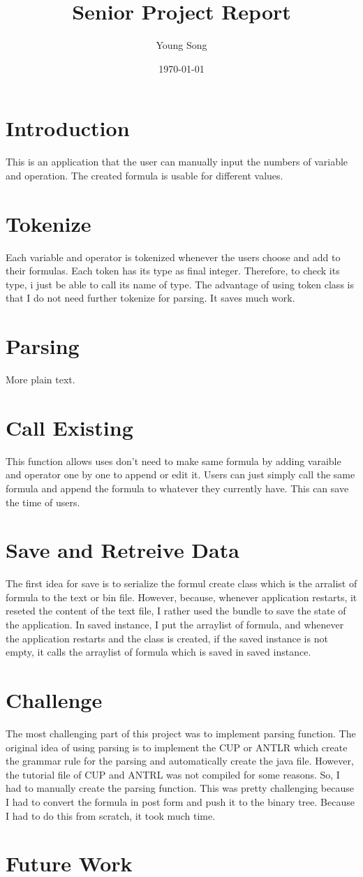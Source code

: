 \documentclass{article}
\title{Senior Project Report}
\author{Young Song}
\date{\today}
\begin{document}
 
 \maketitle

\section{Introduction}
This is an application that the user can manually input the numbers of variable
and operation. The created formula is usable for different values.
\section{Tokenize}
Each variable and operator is tokenized whenever the users choose and add to
their formulas. Each token has its type as final integer. Therefore, to check
its type, i just be able to call its name of type. The advantage of using token
class is that I do not need further tokenize for parsing. It saves much work.
\section{Parsing}

More plain text.
\section{Call Existing}
This function allows uses don't need to make same formula by adding varaible and
operator one by one to append or edit it. Users can just simply call the same
formula and append the formula to whatever they currently have. This can save
the time of users.
\section{Save and Retreive Data}
The first idea for save is to serialize the formul create class which is the
arralist of formula to the text or bin file. However, because, whenever
application restarts, it reseted the content of the text file, I rather used the
bundle to save the state of the application. In saved instance, I put the
arraylist of formula, and whenever the application restarts and the class is
created, if the saved instance is not empty, it calls the arraylist of formula
which is saved in saved instance.
\section{Challenge}
The most challenging part of this project was to implement parsing function. The
original idea of using parsing is to implement the CUP or ANTLR which create the
grammar rule for the parsing and automatically create the java file. However,
the tutorial file of CUP and ANTRL was not compiled for some reasons. So, I had
to manually create the parsing function. This was pretty challenging because I
had to convert the formula in post form and push it to the binary tree. Because
I had to do this from scratch, it took much time.
\section{Future Work}
\end{document}

